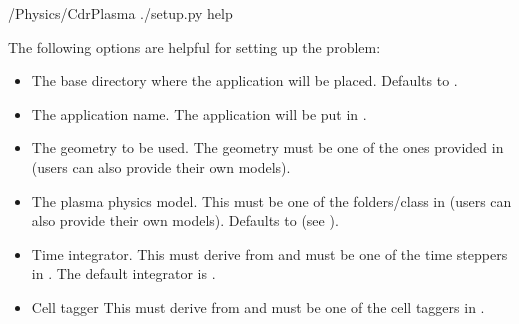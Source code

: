 \documentclass[letterpaper,10pt,english]{sphinxmanual}
\begin{document}
\begin{sphinxVerbatim}[commandchars=\\\{\},formatcom=\scriptsize]
 /Physics/CdrPlasma
./setup.py \PYGZhy{}\PYGZhy{}help
\end{sphinxVerbatim}

The following options are helpful for setting up the problem:
\begin{itemize}
\item {} 
 The base directory where the application will be placed.
Defaults to .

\item {} 
 The application name.
The application will be put in .

\item {} 
 The geometry to be used.
The geometry must be one of the ones provided in  (users can also provide their own models).

\item {} 
 The plasma physics model.
This must be one of the folders/class in  (users can also provide their own models).
Defaults to  (see {\hyperref[\detokenize{Applications/CdrPlasmaModel:chap-cdrplasmajson}]{}}).

\item {} 
 Time integrator.
This must derive from  and must be one of the time steppers in .
The default integrator is .

\item {} 
 Cell tagger
This must derive from  and must be one of the cell taggers in .

\end{itemize}
\end{document}

